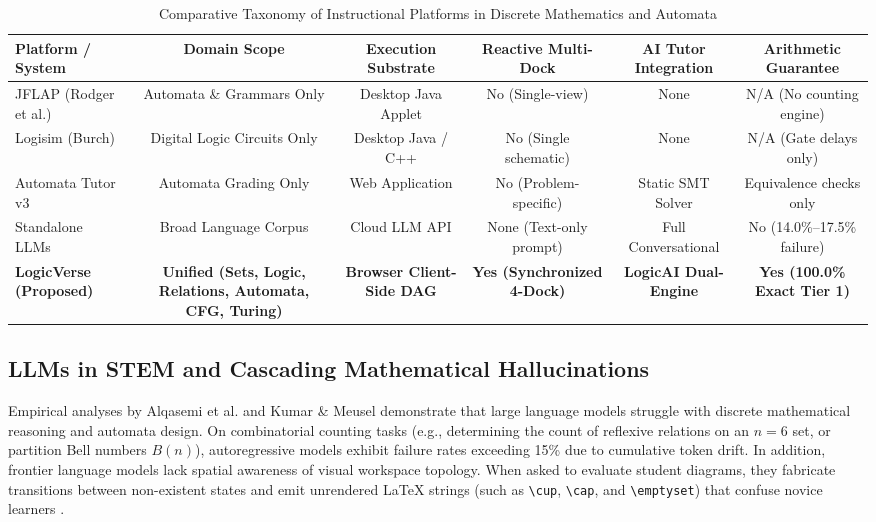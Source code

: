 \documentclass[conference]{IEEEtran}
\begin{document}
\begin{table}[t]
\centering
\caption{Comparative Taxonomy of Instructional Platforms in Discrete Mathematics and Automata}
\label{tab:taxonomy}
\begin{tabularx}{\textwidth}{lccccc}
\toprule
\textbf{Platform / System} & \textbf{Domain Scope} & \textbf{Execution Substrate} & \textbf{Reactive Multi-Dock} & \textbf{AI Tutor Integration} & \textbf{Arithmetic Guarantee} \\
\midrule
JFLAP \cite{rodger2006jflap} (Rodger et al.) & Automata \& Grammars Only & Desktop Java Applet & No (Single-view) & None & N/A (No counting engine) \\
Logisim \cite{burch2002logisim} (Burch) & Digital Logic Circuits Only & Desktop Java / C++ & No (Single schematic) & None & N/A (Gate delays only) \\
Automata Tutor v3 \cite{dantoni2020automata} & Automata Grading Only & Web Application & No (Problem-specific) & Static SMT Solver & Equivalence checks only \\
Standalone LLMs \cite{achiam2023gpt4, gemini2024team} & Broad Language Corpus & Cloud LLM API & None (Text-only prompt) & Full Conversational & No (14.0\%--17.5\% failure) \\
\textbf{LogicVerse (Proposed)} & \textbf{Unified (Sets, Logic, Relations, Automata, CFG, Turing)} & \textbf{Browser Client-Side DAG} & \textbf{Yes (Synchronized 4-Dock)} & \textbf{LogicAI Dual-Engine} & \textbf{Yes (100.0\% Exact Tier 1)} \\
\bottomrule
\end{tabularx}
\end{table}

\subsection{LLMs in STEM and Cascading Mathematical Hallucinations}
Empirical analyses by Alqasemi et al. \cite{alqasemi2024hallucinations} and Kumar \& Meusel \cite{kumar2023evaluating} demonstrate that large language models struggle with discrete mathematical reasoning and automata design. On combinatorial counting tasks (e.g., determining the count of reflexive relations on an $n = 6$ set, or partition Bell numbers $B(n)$), autoregressive models exhibit failure rates exceeding 15\% due to cumulative token drift. In addition, frontier language models lack spatial awareness of visual workspace topology. When asked to evaluate student diagrams, they fabricate transitions between non-existent states and emit unrendered \LaTeX{} strings (such as \texttt{\textbackslash cup}, \texttt{\textbackslash cap}, and \texttt{\textbackslash emptyset}) that confuse novice learners \cite{kumar2023evaluating}.
\end{document}
